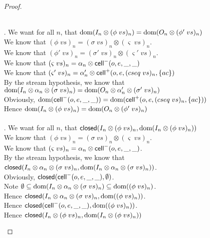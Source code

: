 \begin{proof}
\begin{enumerate}
\begin{tabbedproof}
  \\ . We want for all $n$, that $\mbox{dom}({I_n \otimes (\phi\;vs)_n}) = \mbox{dom}({O_n \otimes (\phi'\;vs)_n})$ \\
  \ooo We know that $(\phi\;vs)_n = (\sigma\;vs)_n \otimes (\varsigma\;vs)_n$. \\
  \ooo We know that $(\phi'\;vs)_n = (\sigma'\;vs)_n \otimes (\varsigma'\;vs)_n$. \\
  \ooo We know that $(\varsigma\;vs)_n = \alpha_n \otimes \mathsf{cell}^{-}({o}, {e}, {\_}, {\_})$ \\
  \ooo We know that $(\varsigma'\;vs)_n = \alpha'_n \otimes \mathsf{cell}^{+}({o}, {e}, {(cseq\;vs)_n}, {\{{ac}\}})$ \\
  \ooo By the stream hypothesis, we know that \\
  \ooox $\mbox{dom}({I_n \otimes \alpha_n \otimes (\sigma\;vs)_n}) = 
       \mbox{dom}({O_n \otimes \alpha'_n \otimes (\sigma'\;vs)_n})$ \\
  \ooo Obviously, $\mbox{dom}({\mathsf{cell}^{-}({o}, {e}, {\_}, {\_})}) = \mbox{dom}({\mathsf{cell}^{+}({o}, {e}, {(cseq\;vs)_n}, {\{{ac}\}})})$ \\
  \ooo Hence $\mbox{dom}({I_n \otimes (\phi\;vs)_n}) = \mbox{dom}({O_n \otimes (\phi'\;vs)_n})$ \\

  \\ . We want for all $n$, that $\mathsf{closed}({I_n \otimes (\phi\;vs)_n}, {\mbox{dom}({I_n \otimes (\phi\;vs)_n})})$\\
  \ooo We know that $(\phi\;vs)_n = (\sigma\;vs)_n \otimes (\varsigma\;vs)_n$. \\
  \ooo We know that $(\varsigma\;vs)_n = \alpha_n \otimes \mathsf{cell}^{-}({o}, {e}, {\_}, {\_})$. \\
  \ooo By the stream hypothesis, we know that \\
  \oooo $\mathsf{closed}({I_n \otimes \alpha_n \otimes (\sigma\;vs)_n}, {\mbox{dom}({I_n \otimes \alpha_n \otimes (\sigma\;vs)_n})})$. \\
  \ooo Obviously, $\mathsf{closed}({\mathsf{cell}^{-}({o}, {e}, {\_}, {\_})}, {\emptyset})$. \\
  \ooo Note $\emptyset \subseteq \mbox{dom}({I_n \otimes \alpha_n \otimes (\sigma\;vs)_n}) \subseteq \mbox{dom}({(\phi\;vs)_n})$. \\
  \ooo Hence $\mathsf{closed}({I_n \otimes \alpha_n \otimes (\sigma\;vs)_n}, {\mbox{dom}({(\phi\;vs)_n})})$. \\ 
  \ooo Hence $\mathsf{closed}({\mathsf{cell}^{-}({o}, {e}, {\_}, {\_})}, {\mbox{dom}({(\phi\;vs)_n})})$. \\
  \ooo Hence $\mathsf{closed}({I_n \otimes (\phi\;vs)_n}, {\mbox{dom}({I_n \otimes (\phi\;vs)_n})})$\\


\end{tabbedproof}
\end{enumerate}
\end{proof}

